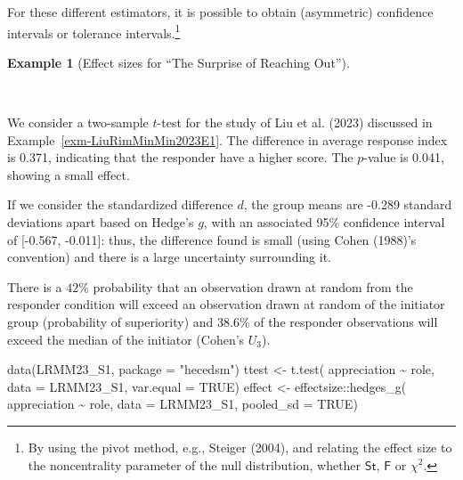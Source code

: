 \documentclass[
  11pt,
  letterpaper,
]{scrbook}
\newenvironment{Shaded}{\begin{snugshade}}{\end{snugshade}}
\newcommand{\AttributeTok}[1]{\textcolor[rgb]{0.40,0.45,0.13}{#1}}
\newcommand{\ConstantTok}[1]{\textcolor[rgb]{0.56,0.35,0.01}{#1}}
\newcommand{\FunctionTok}[1]{\textcolor[rgb]{0.28,0.35,0.67}{#1}}
\newcommand{\NormalTok}[1]{\textcolor[rgb]{0.00,0.23,0.31}{#1}}
\newcommand{\OtherTok}[1]{\textcolor[rgb]{0.00,0.23,0.31}{#1}}
\newcommand{\SpecialCharTok}[1]{\textcolor[rgb]{0.37,0.37,0.37}{#1}}
\newcommand{\StringTok}[1]{\textcolor[rgb]{0.13,0.47,0.30}{#1}}
\theoremstyle{definition}
\newtheorem{example}{Example}[chapter]
\theoremstyle{remark}
\begin{document}
For these different estimators, it is possible to obtain (asymmetric)
confidence intervals or tolerance intervals.\footnote{By using the pivot
  method, e.g., Steiger (2004), and relating the effect size to the
  noncentrality parameter of the null distribution, whether
  \(\mathsf{St}\), \(\mathsf{F}\) or \(\chi^2\).}

\begin{example}[Effect sizes for ``The Surprise of Reaching
Out'']\protect\hypertarget{exm-LiuRimMinMin2023E1effect}{}\label{exm-LiuRimMinMin2023E1effect}

~

We consider a two-sample \(t\)-test for the study of Liu et al. (2023)
discussed in Example~\ref{exm-LiuRimMinMin2023E1}. The difference in
average response index is 0.371, indicating that the responder have a
higher score. The \(p\)-value is 0.041, showing a small effect.

If we consider the standardized difference \(d\), the group means are
-0.289 standard deviations apart based on Hedge's \(g\), with an
associated 95\% confidence interval of {[}-0.567, -0.011{]}: thus, the
difference found is small (using Cohen (1988)'s convention) and there is
a large uncertainty surrounding it.

There is a \(42\)\% probability that an observation drawn at random from
the responder condition will exceed an observation drawn at random of
the initiator group (probability of superiority) and \(38.6\)\% of the
responder observations will exceed the median of the initiator (Cohen's
\(U_3\)).

\begin{Shaded}
\begin{Highlighting}[]
\FunctionTok{data}\NormalTok{(LRMM23\_S1, }\AttributeTok{package =} \StringTok{"hecedsm"}\NormalTok{)}
\NormalTok{ttest }\OtherTok{\textless{}{-}} \FunctionTok{t.test}\NormalTok{(}
\NormalTok{  appreciation }\SpecialCharTok{\textasciitilde{}}\NormalTok{ role, }
  \AttributeTok{data =}\NormalTok{ LRMM23\_S1,}
  \AttributeTok{var.equal =} \ConstantTok{TRUE}\NormalTok{)}
\NormalTok{effect }\OtherTok{\textless{}{-}}\NormalTok{ effectsize}\SpecialCharTok{::}\FunctionTok{hedges\_g}\NormalTok{(}
\NormalTok{  appreciation }\SpecialCharTok{\textasciitilde{}}\NormalTok{ role, }
  \AttributeTok{data =}\NormalTok{ LRMM23\_S1, }
  \AttributeTok{pooled\_sd =} \ConstantTok{TRUE}\NormalTok{)}
\end{Highlighting}
\end{Shaded}

\end{example}
\end{document}
